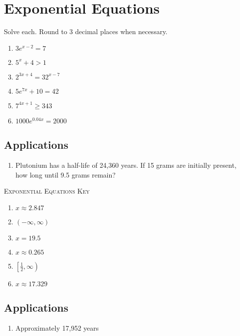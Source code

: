 \chapter{Exponential Equations}

Solve each. Round to 3 decimal places when necessary.
\begin{enumerate}
	\item $3e^{x-2} = 7$
	\item $5^x + 4 > 1$
	\item $2^{3x+4} = 32^{x-7}$
	\item $5e^{7x} + 10 = 42$
	\item $7^{4x+1} \geq 343$
	\item $1000e^{0.04x} = 2000$
\end{enumerate}

\section{Applications}
\begin{enumerate}
	\item Plutonium has a half-life of 24,360 years. If 15 grams are initially present, how long until 9.5 grams remain?
\end{enumerate}

\newpage

\textsc{Exponential Equations Key}

\begin{enumerate}
	\item $x \approx 2.847$
	\item $(-\infty, \infty)$
	\item $x = 19.5$
	\item $x \approx 0.265$
	\item $\left[\frac{1}{2}, \infty\right)$
	\item $x \approx 17.329$
\end{enumerate}

\section*{Applications}

\begin{enumerate}
	\item Approximately 17,952 years
\end{enumerate}